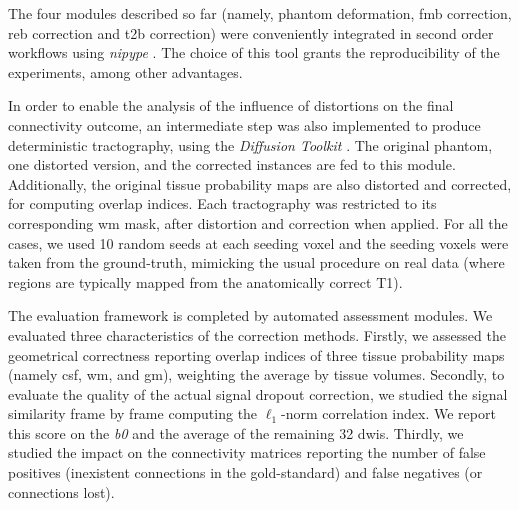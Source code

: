 The four modules described so far (namely, phantom
deformation, \gls*{fmb} correction, \gls*{reb}
correction and \gls*{t2b} correction) were conveniently
integrated in second order workflows using
\emph{nipype} \cite{gorgolewski_nipype:_2011}.
The choice of this tool grants the reproducibility
of the experiments, among other advantages.

In order to enable the analysis of the influence of
distortions on the final connectivity outcome,
an intermediate step was also implemented to
produce deterministic tractography,
using the \emph{Diffusion Toolkit} \cite{wang_diffusion_2007}.
The original phantom, one distorted version, and
the corrected instances are fed to this module.
Additionally, the original tissue probability maps
are also distorted and corrected, for computing overlap
indices.
Each tractography was restricted to its corresponding 
\gls*{wm} mask, after distortion and correction when
applied. For all the cases, we used 10 random seeds at each seeding
voxel and the seeding voxels were taken from the 
ground-truth, mimicking the usual procedure on real data
(where regions are typically mapped from the
anatomically correct T1).

The evaluation framework is completed by automated 
assessment modules. We evaluated three characteristics
of the correction methods. 
Firstly, we assessed the geometrical correctness
reporting overlap indices of three tissue
probability maps (namely \gls*{csf}, \gls*{wm},
and \gls*{gm}), weighting the average by tissue
volumes.
Secondly, to evaluate the quality of the actual 
signal dropout correction, we studied the 
signal similarity frame by frame computing the $\ell_1$-norm
correlation index. We report this score
on the \textit{b0} and the average of the remaining 32 
\glspl*{dwi}. Thirdly, we studied the impact on the
connectivity matrices reporting the number of
false positives (inexistent connections in the
gold-standard) and false negatives (or connections
lost).